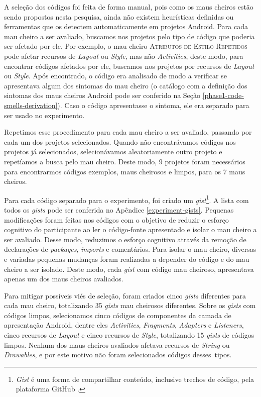 A seleção dos códigos foi feita de forma manual, pois como os maus cheiros estão sendo propostos nesta pesquisa, ainda não existem heurísticas definidas ou ferramentas que os detectem automaticamente em projetos Android. Para cada mau cheiro a ser avaliado, buscamos nos projetos pelo tipo de código que poderia ser afetado por ele. Por exemplo, o mau cheiro \textsc{\small Atributos de Estilo Repetidos} pode afetar recursos de \textit{Layout} ou \textit{Style}, mas não \textit{Activities}, deste modo, para encontrar códigos afetados por ele, buscamos nos projetos por recursos de \textit{Layout} ou \textit{Style}. Após encontrado, o código era analisado de modo a verificar se apresentava algum dos sintomas do mau cheiro (o catálogo com a definição dos sintomas dos maus cheiros Android pode ser conferido na Seção \ref{phase1-code-smells-derivation}). Caso o código apresentasse o sintoma, ele era separado para ser usado no experimento. 

Repetimos esse procedimento para cada mau cheiro a ser avaliado, passando por cada um dos projetos selecionados. Quando não encontrávamos códigos nos projetos já selecionados, selecionávamos aleatoriamente outro projeto e repetíamos a busca pelo mau cheiro. Deste modo, 9 projetos foram necessários para encontrarmos códigos exemplos, maus cheirosos e limpos, para os 7 maus cheiros.


Para cada código separado para o experimento, foi criado um \textit{gist}\footnote{\textit{Gist} é uma forma de compartilhar conteúdo, inclusive trechos de código, pela plataforma GitHub \cite{Gists}.}. A lista com todos os \textit{gists} pode ser conferida no Apêndice \ref{experiment-gists}. Pequenas modificações foram feitas nos códigos com o objetivo de reduzir o esforço cognitivo do participante ao ler o código-fonte apresentado e isolar o mau cheiro a ser avaliado. Desse modo, reduzimos o esforço cognitivo através da remoção de declarações de \textit{packages}, \textit{imports} e comentários. Para isolar o mau cheiro, diversas e variadas pequenas mudanças foram realizadas a depender do código e do mau cheiro a ser isolado. Deste modo, cada \textit{gist} com código mau cheiroso, apresentava apenas um dos maus cheiros avaliados. 

Para mitigar possíveis viés de seleção, foram criados cinco \textit{gists} diferentes para cada mau cheiro, totalizando 35 \textit{gists} mau cheirosos diferentes. Sobre os \textit{gists} com códigos limpos, selecionamos cinco códigos de componentes da camada de apresentação Android, dentre eles \textit{Activities}, \textit{Fragments}, \textit{Adapters} e \textit{Listeners}, cinco recursos de \textit{Layout} e cinco recursos de \textit{Style}, totalizando 15 \textit{gists} de códigos limpos. Nenhum dos maus cheiros avaliados afetava recursos de \textit{String} ou \textit{Drawables}, e por este motivo não foram selecionados códigos desses~tipos.

